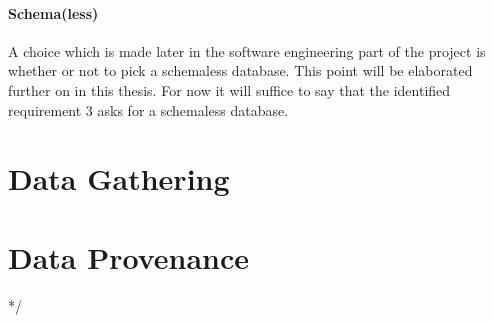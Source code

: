 \paragraph{Schema(less)}
\label{datamodel-schema}

A choice which is made later in the software engineering part of the project is whether or not to pick a schemaless database.
This point will be elaborated further on in this thesis.
For now it will suffice to say that the identified requirement 3 asks for a schemaless database.

\section{Data Gathering}
\label{datamodel-gathering}



\section{Data Provenance}
\label{datamodel-provenance}*/